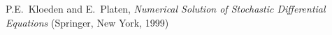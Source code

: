 \documentclass[aps,twocolumn,superscriptaddress,showpacs,showkeys]{revtex4}
\begin{document}
{\begin{thebibliography}{00}




       P.E.~Kloeden and E.~Platen,
                         {\it Numerical Solution of Stochastic Differential Equations}
                         (Springer, New York, 1999)













\end{thebibliography}}
\end{document}
